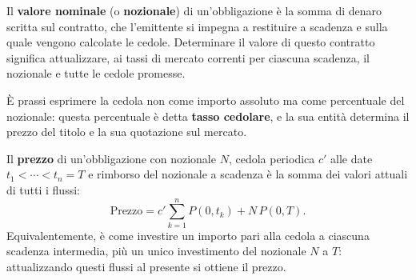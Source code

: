 \documentclass[11pt,a4paper]{article}
\theoremstyle{plain}
\theoremstyle{definition}
\theoremstyle{remark}
\begin{document}
Il \textbf{valore nominale} (o \textbf{nozionale}) di un'obbligazione \`e la somma di
denaro scritta sul contratto, che l'emittente si impegna a restituire a scadenza e sulla
quale vengono calcolate le cedole. Determinare il valore di questo contratto significa
attualizzare, ai tassi di mercato correnti per ciascuna scadenza, il nozionale e tutte le
cedole promesse.

\`E prassi esprimere la cedola non come importo assoluto ma come percentuale del nozionale:
questa percentuale \`e detta \textbf{tasso cedolare}, e la sua entit\`a determina il prezzo del
titolo e la sua quotazione sul mercato.

Il \textbf{prezzo} di un'obbligazione con nozionale $N$, cedola periodica $c'$ alle
date $t_1 < \cdots < t_n = T$ e rimborso del nozionale a scadenza \`e la somma dei valori
attuali di tutti i flussi:
\begin{equation}
  \text{Prezzo} = c' \sum_{k=1}^{n} P(0,t_k) + N\,P(0,T).
  \label{eq:prezzo-bond}
\end{equation}
Equivalentemente, \`e come investire un importo pari alla cedola a ciascuna scadenza
intermedia, pi\`u un unico investimento del nozionale $N$ a $T$: attualizzando questi flussi al
presente si ottiene il prezzo.
\end{document}
